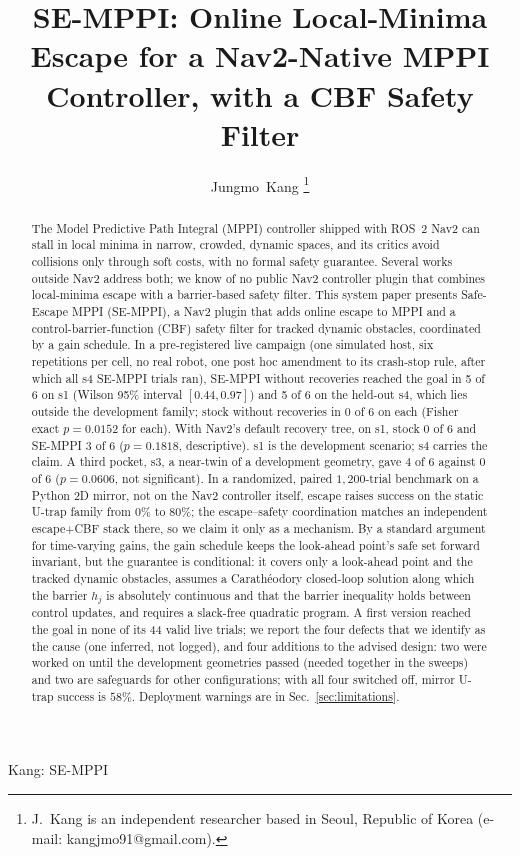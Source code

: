 \documentclass[journal]{IEEEtran}
\begin{document}
\title{SE-MPPI: Online Local-Minima Escape for a Nav2-Native MPPI\\
Controller, with a CBF Safety Filter}

\author{Jungmo~Kang%
\thanks{J.~Kang is an independent researcher based in
Seoul, Republic of Korea (e-mail: kangjmo91@gmail.com).}}

%
{Kang: SE-MPPI}

\maketitle

\begin{abstract}
The Model Predictive Path Integral (MPPI) controller shipped with ROS~2
Nav2 can stall in local minima in narrow, crowded, dynamic spaces, and its
critics avoid collisions only through soft costs, with no formal safety
guarantee. Several works outside Nav2 address both; we know of no public Nav2 controller plugin that
combines local-minima escape with a barrier-based safety filter. This system
paper presents Safe-Escape MPPI (SE-MPPI), a Nav2 plugin that adds online
escape to MPPI and a control-barrier-function (CBF) safety filter for tracked
dynamic obstacles, coordinated by a gain schedule. In a pre-registered live campaign (one
simulated host, six repetitions per cell, no real robot, one post hoc
amendment to its crash-stop rule, after which all s4 SE-MPPI trials ran),
SE-MPPI without recoveries reached the goal in 5 of 6 on s1 (Wilson 95\%
interval $[0.44, 0.97]$) and 5 of 6 on the held-out s4, which lies outside
the development family; stock without recoveries in 0 of 6 on each (Fisher
exact $p=0.0152$ for each). With Nav2's default recovery tree, on s1, stock 0
of 6 and SE-MPPI 3 of 6 ($p=0.1818$, descriptive). s1 is the development
scenario; s4 carries the claim. A third pocket, s3, a near-twin of a development geometry, gave 4 of 6 against 0 of 6
($p=0.0606$, not significant). In a randomized, paired $1{,}200$-trial benchmark
on a Python 2D mirror, not on the Nav2 controller itself, escape raises
success on the static U-trap family from $0\%$ to $80\%$; the escape--safety
coordination matches an independent escape+CBF stack there, so we claim it
only as a mechanism. By a standard argument for time-varying gains, the gain schedule keeps the look-ahead point's safe set forward invariant, but the guarantee is conditional: it
covers only a look-ahead point and the tracked dynamic obstacles, assumes a
Carath\'eodory closed-loop solution along which the barrier $h_j$ is
absolutely continuous and that the barrier inequality holds between control updates,
and requires a slack-free quadratic program. A first version reached the goal in none of its 44 valid
live trials; we report the four defects that we identify as the cause (one
inferred, not logged), and four additions to the advised design: two were worked on until
the development geometries passed (needed together in the sweeps) and two are safeguards for other configurations;
with all four switched off, mirror U-trap success is $58\%$. Deployment warnings are in
Sec.~\ref{sec:limitations}.
\end{abstract}
\end{document}
